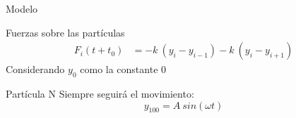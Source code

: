 \begin{frame}{Modelo}
    \begin{block}{Fuerzas sobre las partículas}
        \begin{equation*}
            \begin{aligned}
                F_i(t+t_0) &= -k\ (y_i - y_{i-1}) - k\ (y_i - y_{i+1})
            \end{aligned}\label{eq:equation-particles-movement}
        \end{equation*}
        Considerando \( y_0 \) como la constante 0
    \end{block}

    \begin{block}{Partícula N}
        Siempre seguirá el movimiento: \begin{equation*} y_{100}=A\ sin(\omega t)\end{equation*}
    \end{block}
\end{frame}


